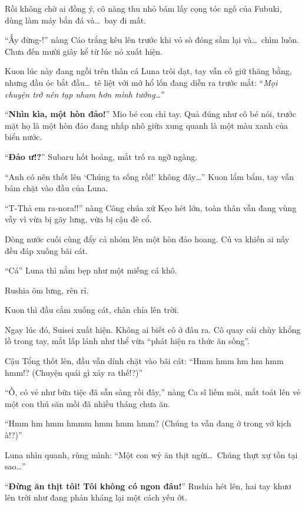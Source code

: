 \documentclass[../main.tex]{subfiles}
\begin{document}
Rồi không chờ ai đồng ý, cô nàng thu nhỏ bám lấy cọng tóc ngố của Fubuki, dùng làm máy bắn đá và\dots\ bay đi mất.

``Ấy đừng-!'' nàng Cáo trắng kêu lên trước khi vỏ sò đóng sầm lại và\dots\ chìm luôn. Chưa đến mười giây kể từ lúc nó xuất hiện.

Kuon lúc này đang ngồi trên thân cá Luna trôi dạt, tay vẫn cố giữ thăng bằng, nhưng đầu óc bắt đầu\dots\ tê liệt với mớ hổ lốn đang diễn ra trước mắt: ``\textit{Mọi chuyện trở nên tạp nham hơn mình tưởng\dots}''

\ct

``\textbf{Nhìn kìa, một hòn đảo!}'' Mio bé con chỉ tay. Quả đúng như cô bé nói, trước mặt họ là một hòn đảo đang nhấp nhô giữa xung quanh là một màu xanh của biển nước.

``\textbf{Đảo ư!?}'' Subaru hốt hoảng, mắt trố ra ngỡ ngàng.

``Anh có nên thốt lên `Chúng ta sống rồi!' không đây\dots'' Kuon lẩm bẩm, tay vẫn bám chặt vào đầu của Luna.

``T-Thả em ra-nora!!'' nàng Công chúa xứ Kẹo hét lớn, toàn thân vẫn đang vùng vẫy vì vừa bị gãy lưng, vừa bị cậu đè cổ.

Dòng nước cuối cùng đẩy cả nhóm lên một hòn đảo hoang. Cú va khiến ai nấy đều đáp xuống bãi cát.

``Cá'' Luna thì nằm bẹp như một miếng cá khô.

Rushia ôm lưng, rên rỉ.

Kuon thì đầu cắm xuống cát, chân chỉa lên trời.


Ngay lúc đó, Suisei xuất hiện. Không ai biết cô ở đâu ra. Cô quay cái chùy khổng lồ trong tay, mắt lấp lánh như thể vừa ``phát hiện ra thức ăn sống''.

Cậu Tổng thốt lên, đầu vẫn dính chặt vào bãi cát: ``Hmm hmm hm hm hmm hmm!? (Chuyện quái gì xảy ra thế!?)''

``Ồ, có vẻ như bữa tiệc đã sẵn sàng rồi đây,'' nàng Ca sĩ liếm môi, mắt toát lên vẻ một con thú săn mồi đã nhiều tháng chưa ăn.

``Hmm hm hmm hmmm hmm hmm hmm? (Chúng ta vẫn đang ở trong vở kịch à!?)''

Luna nhìn quanh, rùng mình: ``Một con wỷ ăn thịt ngừi\dots\ Chúng thựt xự tồn tại sao\dots''

``\textbf{Đừng ăn thịt tôi! Tôi không có ngon đâu!}'' Rushia hét lên, hai tay khươ lên trời như đang phản kháng lại một cách yếu ớt.
\end{document}
